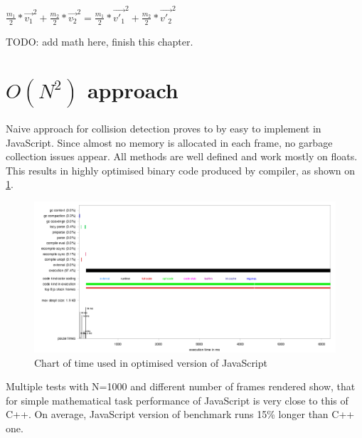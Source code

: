 $\frac{m_1}{2}*\vec{v_1}^2 + \frac{m_2}{2}*\vec{v_2}^2 = \frac{m_1}{2}*\vec{v'_1}^2 + \frac{m_2}{2}*\vec{v'_2}^2$

TODO: add math here, finish this chapter.

\section{{$O(N^2)$} approach}
\label{sec:sphereinitial}

Naive approach for collision detection proves to by easy to implement in JavaScript. Since almost no memory is allocated in each frame, no garbage collection issues appear. All methods are well defined and work mostly on floats. This results in highly optimised binary code produced by compiler, as shown on \ref{img:spheres1profile}.

\begin{figure}[h!]
  \caption{Chart of time used in optimised version of JavaScript}
  \label{img:spheres1profile}
  \centering
	\includegraphics[width=16cm]{spheres/spheres1-profile.png}
\end{figure} 

Multiple tests with N=1000 and different number of frames rendered show, that for simple mathematical task performance of JavaScript is very close to this of C++. On average, JavaScript version of benchmark runs 15\% longer than C++ one.

